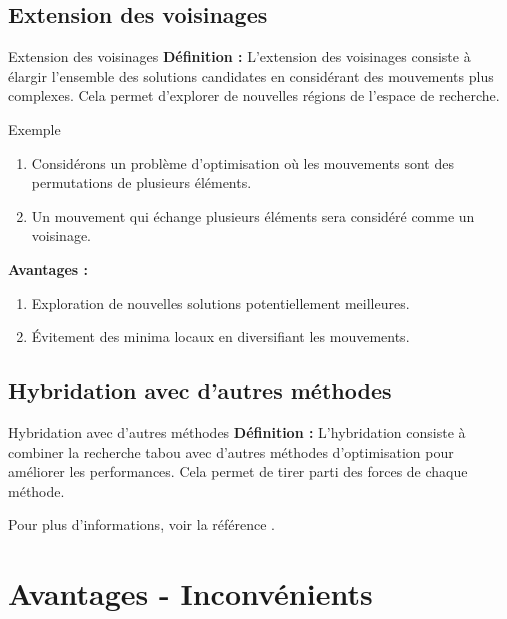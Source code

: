 \documentclass[10pt, handout]{beamer}
\begin{document}
\subsection{Extension des voisinages}
\begin{frame}{Extension des voisinages}
    \textbf{Définition :}
    L'extension des voisinages consiste à élargir l'ensemble des solutions candidates en considérant des mouvements plus complexes. Cela permet d'explorer de nouvelles régions de l'espace de recherche.

    \bigskip

    \begin{exampleblock}{Exemple}
        \begin{enumerate}
            \item Considérons un problème d'optimisation où les mouvements sont des permutations
                  de plusieurs éléments.
            \item Un mouvement qui échange plusieurs éléments sera considéré comme un voisinage.
        \end{enumerate}
    \end{exampleblock}
    \bigskip
    \textbf{Avantages :}
    \begin{enumerate}
        \item Exploration de nouvelles solutions potentiellement meilleures.
        \item Évitement des minima locaux en diversifiant les mouvements.
    \end{enumerate}
\end{frame}

\subsection{Hybridation avec d'autres méthodes}
\begin{frame}{Hybridation avec d'autres méthodes}
    \textbf{Définition :}
    L'hybridation consiste à combiner la recherche tabou avec d'autres méthodes d'optimisation pour améliorer les performances. Cela permet de tirer parti des forces de chaque méthode.

    \bigskip

    Pour plus d'informations, voir la référence \cite{ref1}.
\end{frame}

\section{Avantages - Inconvénients}
\end{document}
